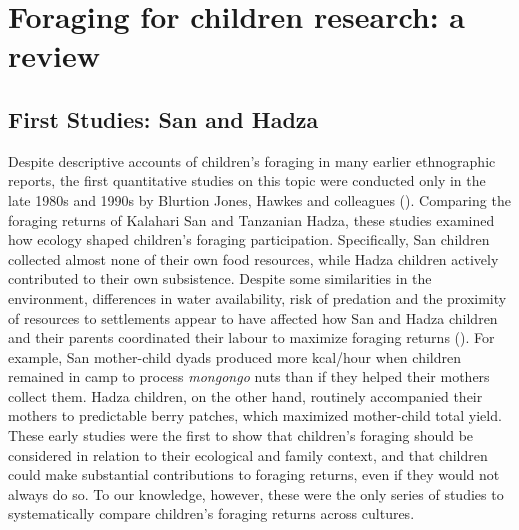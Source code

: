 \section{Foraging for children research: a review}

\subsection{First Studies: San and Hadza}
Despite descriptive accounts of children's foraging in many earlier ethnographic reports, the first quantitative  studies on this topic were conducted only in the late 1980s and 1990s by Blurtion Jones, Hawkes and colleagues (\cite{blurton_jones_modelling_1989, blurton_jones_differences_1994, blurton_jones_foraging_1994, blurton_jones_why_1997, hawkes_hadza_1995}).
Comparing the foraging returns of Kalahari San and Tanzanian Hadza, these studies examined how ecology shaped children’s foraging participation. Specifically, San children collected almost none of their own food resources, while Hadza children actively contributed to their own subsistence. Despite some similarities in the environment, differences in water availability, risk of predation and the proximity of resources to settlements appear to have affected how San and Hadza children and their parents coordinated their labour to maximize foraging returns (\cite{hawkes_hadza_1995}). For example, San mother-child dyads produced more kcal/hour  when children remained in camp to process \textit{mongongo} nuts than if they helped their mothers collect them. Hadza children, on the other hand, routinely accompanied their mothers to predictable berry patches, which maximized mother-child total yield. These early studies were the first to show that children’s foraging should be considered in relation to their ecological and family context, and that children could make substantial contributions to foraging returns, even if they would not always do so. To our knowledge, however, these were the only series of studies to systematically compare children’s foraging returns across cultures. 

